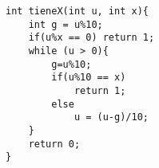 \begin{verbatim}
int tieneX(int u, int x){
	int g = u%10;
	if(u%x == 0) return 1;
	while (u > 0){
		g=u%10;
		if(u%10 == x)
			return 1;
		else
			u = (u-g)/10;
	}
	return 0;
}
\end{verbatim}